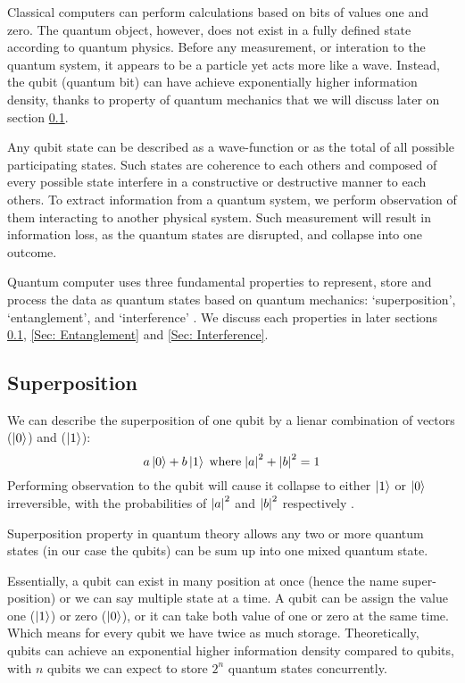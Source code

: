 Classical computers can perform calculations based on bits of values one and zero. 
The quantum object, however, does not exist in a fully defined state according to quantum physics.
Before any measurement, or interation to the quantum system, it appears to be a particle yet acts more like a wave.
Instead, the qubit (quantum bit) can have achieve exponentially higher information density, thanks to property of quantum mechanics that we will discuss later on section \ref{Sec: Superposition}.

Any qubit state can be described as a wave-function or as the total of all possible participating states.
Such states are coherence to each others and composed of every possible state interfere in a constructive or destructive manner to each others.
To extract information from a quantum system, we perform observation of them interacting to another physical system.
Such measurement will result in information loss, as the quantum states are disrupted, and collapse into one outcome.

Quantum computer uses three fundamental properties to represent, store and process the data as quantum states based on quantum mechanics: `superposition', `entanglement', and `interference' \cite{nationalacademiesofsciencesQuantumComputingProgress2019}.
We discuss each properties in later sections \ref{Sec: Superposition}, \ref{Sec: Entanglement} and \ref{Sec: Interference}.

\subsection{Superposition} \label{Sec: Superposition}

We can describe the superposition of one qubit by a lienar combination of vectors ($\left\vert{0}\right\rangle$) and ($\left\vert{1}\right\rangle$):
\begin{equation}
    a \left\vert{0}\right\rangle + b \left\vert{1}\right\rangle
    \;\text{where}\;
    \abs{a}^2 + \abs{b}^2 = 1
\end{equation}
Performing observation to the qubit will cause it collapse to either $\left\vert{1}\right\rangle$ or $\left\vert{0}\right\rangle$ irreversible, with the probabilities of $\abs{a}^2$ and $\abs{b}^2$ respectively \cite{sutorDancingQubitsHow2019a}.

Superposition property in quantum theory allows any two or more quantum states (in our case the qubits) can be sum up into one mixed quantum state.

Essentially, a qubit can exist in many position at once (hence the name super-position) or we can say multiple state at a time.
A qubit can be assign the value one ($\left\vert{1}\right\rangle$) or zero ($\left\vert{0}\right\rangle$), or it can take both value of one or zero at the same time.
Which means for every qubit we have twice as much storage.
Theoretically, qubits can achieve an exponential higher information density compared to qubits, with $n$ qubits we can expect to store $2^n$ quantum states concurrently.

